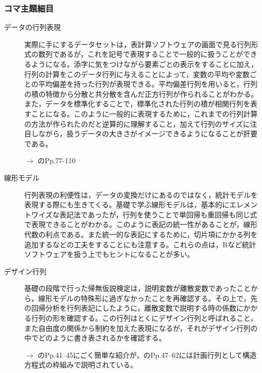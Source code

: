 \subsubsection{コマ主題細目}
\begin{description}
	\item[データの行列表現] 実際に手にするデータセットは，表計算ソフトウェアの画面で見る行列形式の数列であるが，これを記号で表現することで一般的に扱うことができるようになる。添字に気をつけながら要素ごとの表示をすることに加え，行列の計算をこのデータ行列に与えることによって，変数の平均や変数ごとの平均偏差を持った行列が表現できる。平均偏差行列を用いると，行列の積の特徴から分散と共分散を含んだ正方行列が作られることがわかる。また，データを標準化することで，標準化された行列の積が相関行列を表すことになる。このように一般的に表現するために，これまでの行列計算の方法が作られたのだと逆算的に理解すること，加えて行列のサイズに注目しながら，扱うデータの大きさがイメージできるようになることが肝要である。

	      \begin{flushright}
		      $\to$ \textcite{Okada200804}のPp.77-110
	      \end{flushright}

	\item[線形モデル] 行列表現の利便性は，データの変換だけにあるのではなく，統計モデルを表現する際にも生きてくる。基礎で学ぶ線形モデルは，基本的にエレメントワイズな表記法であったが，行列を使うことで単回帰も重回帰も同じ式で表現できることがわかる。このように表記の統一性があることが，線形代数の利点である。また統一的な表記にするために，切片項にかかる列を追加するなどの工夫をすることにも注意する。これらの点は，Rなど統計ソフトウェアを扱う上でもヒントになることが多い。

	\item[デザイン行列] 基礎の段階で行った帰無仮説検定は，説明変数が離散変数であったことから，線形モデルの特殊形に過ぎなかったことを再確認する。その上で，先の回帰分析を行列表記にしたように，離散変数で説明する時の係数にかかる行列の形を確認する。この行列はとくにデザイン行列と呼ばれること，また自由度の関係から制約を加えた表現になるが，それがデザイン行列の中でどのように書き表されるかを確認する。

	      \begin{flushright}
		      $\to$ \textcite{Annette_J_Dobson2008-09-08}のPp.41--45にごく簡単な紹介が，\textcite{Toyoda20000401}のPp.47--62には計画行列として構造方程式の枠組みで説明されている。
	      \end{flushright}


\end{description}
